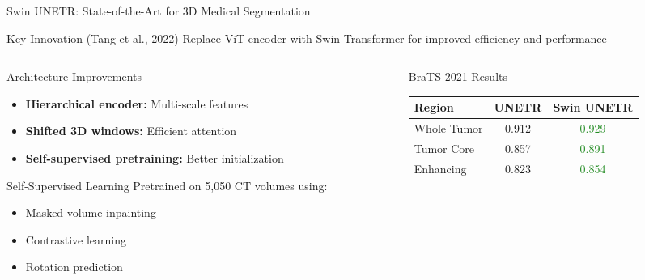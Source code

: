 \documentclass[aspectratio=169]{beamer}
\begin{document}
\begin{frame}{Swin UNETR: State-of-the-Art for 3D Medical Segmentation}
    \begin{block}{Key Innovation (Tang et al., 2022)}
        Replace ViT encoder with Swin Transformer for improved efficiency and performance
    \end{block}
    
    \begin{columns}
        \begin{column}{0.5\textwidth}
            \begin{block}{Architecture Improvements}
                \begin{itemize}
                    \item \textbf{Hierarchical encoder:} Multi-scale features
                    \item \textbf{Shifted 3D windows:} Efficient attention
                    \item \textbf{Self-supervised pretraining:} Better initialization
                \end{itemize}
            \end{block}
            
            \begin{block}{Self-Supervised Learning}
                Pretrained on 5,050 CT volumes using:
                \begin{itemize}
                    \item Masked volume inpainting
                    \item Contrastive learning
                    \item Rotation prediction
                \end{itemize}
            \end{block}
        \end{column}
        \begin{column}{0.5\textwidth}
            \begin{block}{BraTS 2021 Results}
                \begin{center}
                    \begin{tabular}{lcc}
                        \toprule
                        \textbf{Region} & \textbf{UNETR} & \textbf{Swin UNETR} \\
                        \midrule
                        Whole Tumor & 0.912 & \textcolor{ForestGreen}{0.929} \\
                        Tumor Core & 0.857 & \textcolor{ForestGreen}{0.891} \\
                        Enhancing & 0.823 & \textcolor{ForestGreen}{0.854} \\
                        \bottomrule
                    \end{tabular}
                \end{center}
            \end{block}
            

\end{column}
\end{columns}
\end{frame}
\end{document}
